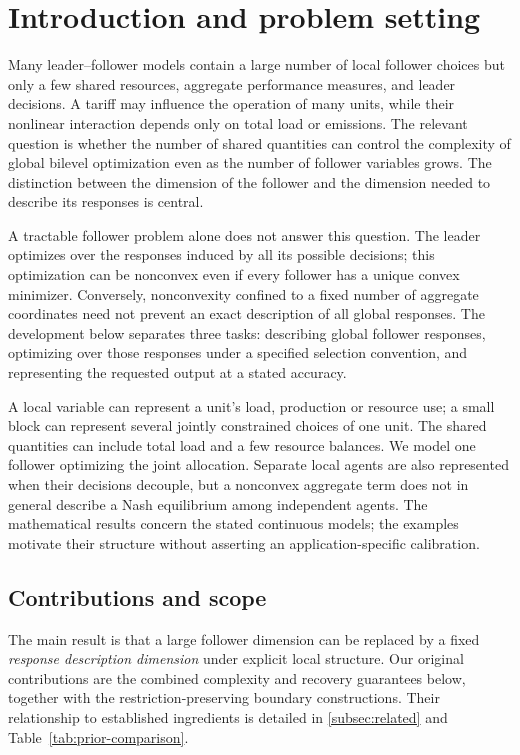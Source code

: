 \section{Introduction and problem setting}\label{sec:foundations}

Many leader--follower models contain a large number of local follower
choices but only a few shared resources, aggregate performance measures,
and leader decisions. A tariff may influence the operation of many units,
while their nonlinear interaction depends only on total load or emissions.
The relevant question is whether the number of shared quantities can
control the complexity of global bilevel optimization even as the number
of follower variables grows. The distinction between the dimension of the
follower and the dimension needed to describe its responses is central.

A tractable follower problem alone does not answer this question. The
leader optimizes over the responses induced by all its possible decisions;
this optimization can be nonconvex even if every follower has a unique
convex minimizer. Conversely, nonconvexity confined to a fixed number of
aggregate coordinates need not prevent an exact description of all global
responses. The development below separates three tasks: describing global
follower responses, optimizing over those responses under a specified
selection convention, and representing the requested output at a stated
accuracy.

A local variable can represent a unit's load, production or resource use;
a small block can represent several jointly constrained choices of one unit.
The shared quantities can include total load and a few resource balances.
We model one follower optimizing the joint allocation. Separate local agents
are also represented when their decisions decouple, but a nonconvex aggregate
term does not in general describe a Nash equilibrium among independent agents.
The mathematical results concern the stated continuous models; the examples
motivate their structure without asserting an application-specific calibration.

\subsection{Contributions and scope}\label{subsec:contributions}

The main result is that a large follower dimension can be replaced by a fixed
\emph{response description dimension} under explicit local structure.
Our original contributions are the combined complexity and recovery guarantees
below, together with the restriction-preserving boundary constructions.
Their relationship to established ingredients is detailed in
\cref{subsec:related} and Table~\ref{tab:prior-comparison}.

